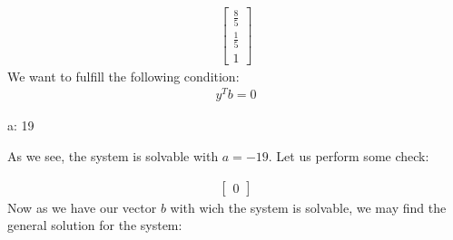 \documentclass[letterpaper,10pt,english]{jupyterBook}
\begin{document}
\begin{sphinxVerbatim}[commandchars=\\\{\}]
  \PYG{p}{[}\PYG{p}{]}
\end{sphinxVerbatim}
\begin{equation*}
\begin{split}\displaystyle \left[\begin{matrix}\frac{8}{5}\\\frac{1}{5}\\1\end{matrix}\right]\end{split}
\end{equation*}
\sphinxAtStartPar
We want to fulfill the following condition:
\begin{equation*}
\begin{split}
y^Tb = 0
\end{split}
\end{equation*}
\begin{sphinxVerbatim}[commandchars=\\\{\}]
   
\end{sphinxVerbatim}

\begin{sphinxVerbatim}[commandchars=\\\{\}]
\PYGZob{}a: \PYGZhy{}19\PYGZcb{}
\end{sphinxVerbatim}

\sphinxAtStartPar
As we see, the system is solvable with \(a = -19\). Let us perform some check:

\begin{sphinxVerbatim}[commandchars=\\\{\}]
   
\end{sphinxVerbatim}
\begin{equation*}
\begin{split}\displaystyle \left[\begin{matrix}0\end{matrix}\right]\end{split}
\end{equation*}
\sphinxAtStartPar
Now as we have our vector \(b\) with wich the system is solvable, we may find the general solution for the system:
\end{document}
